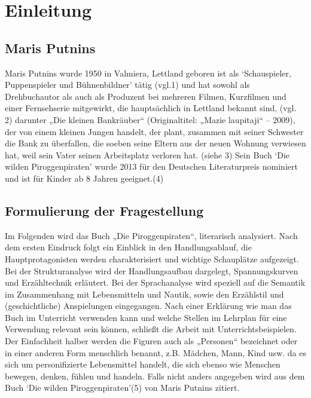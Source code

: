 \chapter{Einleitung}
\section{Maris Putnins}
Maris Putnins wurde 1950 in Valmiera, Lettland geboren ist als `Schauspieler, Puppenspieler und Bühnenbildner' 
tätig (vgl.1) und hat sowohl als Drehbuchautor als auch als Produzent bei mehreren Filmen, Kurzfilmen und einer 
Fernsehserie mitgewirkt, die hauptsächlich in Lettland bekannt  sind, (vgl. 2) darunter „Die kleinen Bankräuber“ 
(Originaltitel: „Mazie laupitaji“ – 2009), der von einem kleinen Jungen handelt, der plant, zusammen mit seiner 
Schwester die Bank zu überfallen, die soeben seine Eltern aus der neuen Wohnung verwiesen hat, weil sein Vater 
seinen Arbeitsplatz verloren hat. (siehe 3) 
Sein Buch `Die wilden Piroggenpiraten' wurde 2013 für den Deutschen Literaturpreis nominiert und ist für Kinder 
ab 8 Jahren geeignet.(4)

\section{Formulierung der Fragestellung}
Im Folgenden wird das Buch „Die Piroggenpiraten“, literarisch analysiert. Nach dem ersten Eindruck folgt ein
Einblick in den Handlungsablauf, die Hauptprotagonisten werden charakterisiert und wichtige Schauplätze aufgezeigt. 
Bei der Strukturanalyse wird der Handlungsaufbau dargelegt, Spannungskurven und Erzähltechnik erläutert. 
Bei der Sprachanalyse wird speziell auf die Semantik im Zusammenhang mit Lebensmitteln und Nautik, sowie 
den Erzählstil und (geschichtliche) Anspielungen eingegangen. Nach einer Erklärung wie man das Buch im Unterricht 
verwenden kann und welche Stellen im Lehrplan für eine Verwendung relevant sein können, schließt die Arbeit mit 
Unterrichtsbeispielen. Der Einfachheit halber werden die Figuren auch als „Personen“ bezeichnet oder in einer anderen 
Form menschlich benannt, z.B. Mädchen, Mann, Kind usw. da es sich um personifizierte Lebensmittel handelt, die sich 
ebenso wie Menschen bewegen, denken, fühlen und handeln. Falls nicht anders angegeben wird aus dem 
Buch `Die wilden Piroggenpiraten'(5) von Maris Putnins zitiert.

